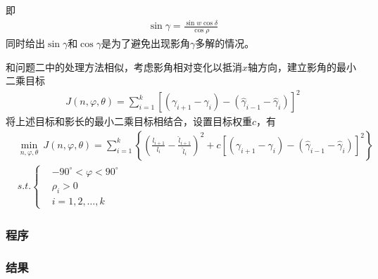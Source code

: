             即
            \begin{align*}
            \sin \gamma = \frac{\sin w\cos\delta}{\cos\rho}
            \end{align*}
            同时给出$\sin \gamma$和$\cos\gamma$是为了避免出现影角$\gamma$多解的情况。
            \par
            和问题二中的处理方法相似，考虑影角相对变化以抵消$x$轴方向，建立影角的最小二乘目标
            \begin{align*}
            J({n,\varphi,\theta}) = \sum_{i=1}^k [(\gamma_{i+1}-\gamma_i)- (\hat{\gamma}_{i-1}-\hat{\gamma}_i)]^2
            \end{align*}
            将上述目标和影长的最小二乘目标相结合，设置目标权重$c$，有
            \begin{align*}
            & \min_{n,\varphi,\theta} \ J({n,\varphi,\theta}) = \sum_{i=1}^k\left\{ \left( \frac{l_{i+1}}{l_i} - \frac{\hat{l}_{i+1}}{\hat{l}_i} \right) ^2+c[(\gamma_{i+1}-\gamma_i)- (\hat{\gamma}_{i-1}-\hat{\gamma}_i)]^2 \right\}\\
            & s.t.\left\{
            \begin{aligned}
            & -90^\circ<\varphi<90^\circ\\
            & \rho_i>0\\
            & i=1,2,\dots,k
            \end{aligned}
            \right.
            \end{align*}

        \subsubsection{程序}
        \subsubsection{结果}

% 
